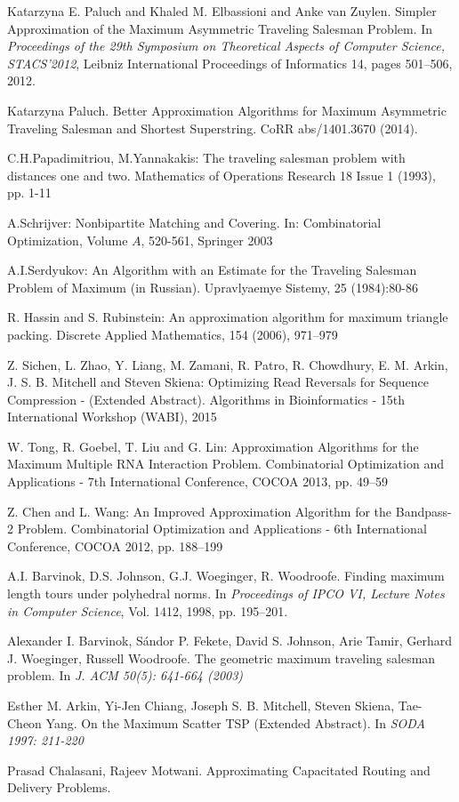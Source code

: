 \documentclass[a4, 11pt]{article}
\newcommand{\<}{\langle}
\renewcommand{\>}{\rangle}
\begin{document}
\begin{thebibliography}{99}
{
Katarzyna E. Paluch and Khaled M. Elbassioni and Anke van Zuylen.
\newblock Simpler Approximation of the Maximum Asymmetric Traveling Salesman Problem.
\newblock In {\em Proceedings of the 29th Symposium on Theoretical Aspects of Computer Science, STACS'2012}, Leibniz International Proceedings of Informatics 14}, pages 501--506, 2012.

Katarzyna Paluch.
\newblock Better Approximation Algorithms for Maximum Asymmetric Traveling Salesman and Shortest Superstring.
\newblock  CoRR abs/1401.3670 (2014).

 C.H.Papadimitriou, M.Yannakakis:
The traveling salesman problem with distances one and two.
Mathematics of Operations Research 18 Issue 1 (1993), pp. 1-11

 A.Schrijver: Nonbipartite Matching and Covering. In:
Combinatorial Optimization, Volume $A$, 520-561, Springer 2003

 A.I.Serdyukov:  An Algorithm with an Estimate for the Traveling Salesman Problem of Maximum (in Russian).
Upravlyaemye Sistemy, 25 (1984):80-86

 R. Hassin and S. Rubinstein: An approximation algorithm for maximum triangle packing.
Discrete Applied Mathematics, 154 (2006), 971--979

 Z. Sichen, L. Zhao, Y. Liang, M. Zamani, R. Patro, R. Chowdhury, E. M. Arkin, J. S. B. Mitchell and Steven Skiena: Optimizing Read Reversals for Sequence Compression - (Extended Abstract).
Algorithms in Bioinformatics - 15th International Workshop ({WABI}), 2015


 W. Tong, R. Goebel, T. Liu and G. Lin: Approximation Algorithms for the Maximum Multiple {RNA} Interaction Problem.
Combinatorial Optimization and Applications - 7th International Conference, {COCOA} 2013, pp. 49--59

 Z. Chen and L. Wang: An Improved Approximation Algorithm for the Bandpass-2 Problem.
Combinatorial Optimization and Applications - 6th International Conference, {COCOA} 2012, pp. 188--199

A.I. Barvinok, D.S. Johnson, G.J. Woeginger, R. Woodroofe.
\newblock Finding maximum length tours under polyhedral norms.
\newblock In {\em Proceedings of IPCO VI, Lecture Notes in Computer Science},
Vol. 1412, 1998, pp. 195–201.

Alexander I. Barvinok, Sándor P. Fekete, David S. Johnson, Arie Tamir, Gerhard J. Woeginger, Russell Woodroofe.
\newblock The geometric maximum traveling salesman problem. 
\newblock In {\em J. ACM 50(5): 641-664 (2003)}

Esther M. Arkin, Yi-Jen Chiang, Joseph S. B. Mitchell, Steven Skiena, Tae-Cheon Yang.
\newblock On the Maximum Scatter TSP (Extended Abstract). 
\newblock In {\em SODA 1997: 211-220}

Prasad Chalasani, Rajeev Motwani.
\newblock Approximating Capacitated Routing and Delivery Problems. 


\end{thebibliography}
\end{document}

